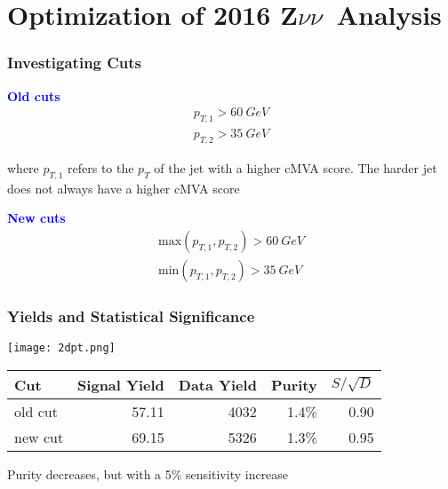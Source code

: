 \documentclass{beamer}
\newcommand{\Znn}{Z$\nu\nu$~}
\begin{document}
\section{Optimization of 2016 \Znn Analysis}

\begin{frame}
  \tableofcontents[currentsection]
\end{frame}

\begin{frame}
  \frametitle{Investigating Cuts}

  {\centering \bf
    \Large{\textcolor{blue}{Old cuts}}
    \begin{gather*}
      p_{T,1} > \SI{60}{GeV} \\
      p_{T,2} > \SI{35}{GeV}
    \end{gather*}
  }

  where $p_{T,1}$ refers to the $p_T$ of the jet with a higher cMVA score.
  The harder jet does not always have a higher cMVA score

  {\centering \bf
    \Large{\textcolor{blue}{New cuts}}
    \begin{gather*}
      \mathrm{max}(p_{T,1}, p_{T,2}) > \SI{60}{GeV} \\
      \mathrm{min}(p_{T,1}, p_{T,2}) > \SI{35}{GeV}
    \end{gather*}
  }

\end{frame}

\begin{frame}
  \frametitle{Yields and Statistical Significance}

  \centering

  \texttt{[image: 2dpt.png]}

  \begin{center}
    \begin{tabular}{|l|r|r|r|r|}
      \hline
      Cut & Signal Yield & Data Yield & Purity & $S/\sqrt{D}$ \\
      \hline
      old cut & 57.11 & 4032 & 1.4\% & 0.90 \\
      new cut & 69.15 & 5326 & 1.3\% & 0.95 \\
      \hline
    \end{tabular}
  \end{center}

  Purity decreases, but with a 5\% sensitivity increase

\end{frame}
\end{document}
